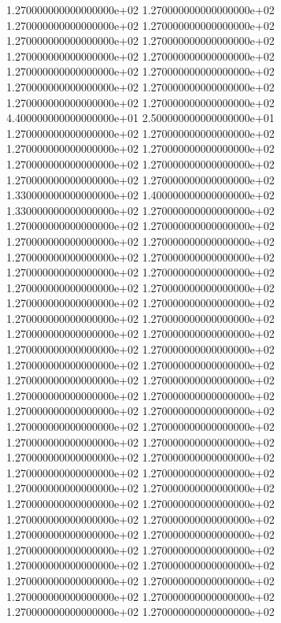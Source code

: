 1.270000000000000000e+02 1.270000000000000000e+02 1.270000000000000000e+02 1.270000000000000000e+02 1.270000000000000000e+02 1.270000000000000000e+02 1.270000000000000000e+02 1.270000000000000000e+02 1.270000000000000000e+02 1.270000000000000000e+02 1.270000000000000000e+02 1.270000000000000000e+02 1.270000000000000000e+02 1.270000000000000000e+02 4.400000000000000000e+01 2.500000000000000000e+01 1.270000000000000000e+02 1.270000000000000000e+02 1.270000000000000000e+02 1.270000000000000000e+02 1.270000000000000000e+02 1.270000000000000000e+02 1.270000000000000000e+02 1.270000000000000000e+02 1.330000000000000000e+02 1.400000000000000000e+02 1.330000000000000000e+02 1.270000000000000000e+02 1.270000000000000000e+02 1.270000000000000000e+02 1.270000000000000000e+02 1.270000000000000000e+02 1.270000000000000000e+02 1.270000000000000000e+02 1.270000000000000000e+02 1.270000000000000000e+02 1.270000000000000000e+02 1.270000000000000000e+02 1.270000000000000000e+02 1.270000000000000000e+02 1.270000000000000000e+02 1.270000000000000000e+02 1.270000000000000000e+02 1.270000000000000000e+02 1.270000000000000000e+02 1.270000000000000000e+02 1.270000000000000000e+02 1.270000000000000000e+02 1.270000000000000000e+02 1.270000000000000000e+02 1.270000000000000000e+02 1.270000000000000000e+02 1.270000000000000000e+02 1.270000000000000000e+02 1.270000000000000000e+02 1.270000000000000000e+02 1.270000000000000000e+02 1.270000000000000000e+02 1.270000000000000000e+02 1.270000000000000000e+02 1.270000000000000000e+02 1.270000000000000000e+02 1.270000000000000000e+02 1.270000000000000000e+02 1.270000000000000000e+02 1.270000000000000000e+02 1.270000000000000000e+02 1.270000000000000000e+02 1.270000000000000000e+02 1.270000000000000000e+02 1.270000000000000000e+02 1.270000000000000000e+02 1.270000000000000000e+02 1.270000000000000000e+02 1.270000000000000000e+02 1.270000000000000000e+02 1.270000000000000000e+02 1.270000000000000000e+02 1.270000000000000000e+02 1.270000000000000000e+02
